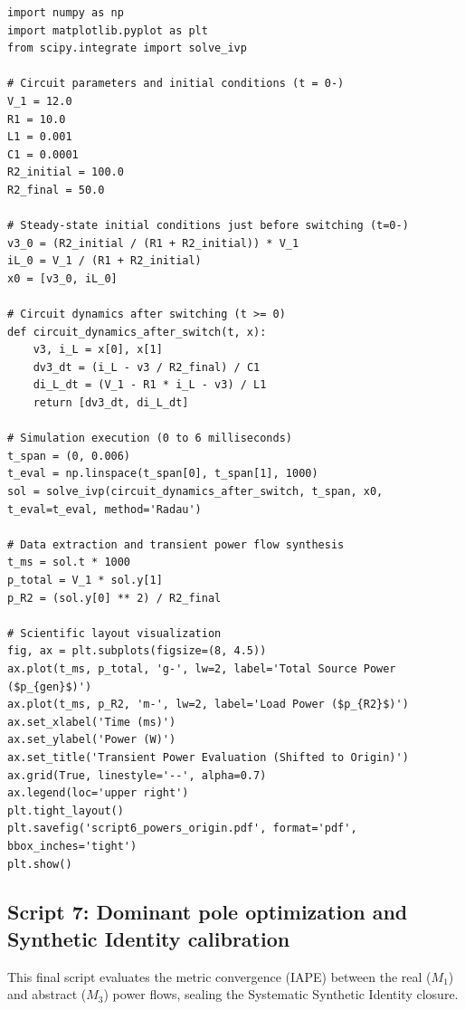 \documentclass[energies,accept,oneauthor,pdftex]{Definitions/mdpi}
\begin{document}
{\footnotesize
\begin{verbatim}
import numpy as np
import matplotlib.pyplot as plt
from scipy.integrate import solve_ivp

# Circuit parameters and initial conditions (t = 0-)
V_1 = 12.0
R1 = 10.0
L1 = 0.001
C1 = 0.0001
R2_initial = 100.0
R2_final = 50.0

# Steady-state initial conditions just before switching (t=0-)
v3_0 = (R2_initial / (R1 + R2_initial)) * V_1
iL_0 = V_1 / (R1 + R2_initial)
x0 = [v3_0, iL_0]

# Circuit dynamics after switching (t >= 0)
def circuit_dynamics_after_switch(t, x):
    v3, i_L = x[0], x[1]
    dv3_dt = (i_L - v3 / R2_final) / C1
    di_L_dt = (V_1 - R1 * i_L - v3) / L1
    return [dv3_dt, di_L_dt]

# Simulation execution (0 to 6 milliseconds)
t_span = (0, 0.006)
t_eval = np.linspace(t_span[0], t_span[1], 1000)
sol = solve_ivp(circuit_dynamics_after_switch, t_span, x0, t_eval=t_eval, method='Radau')

# Data extraction and transient power flow synthesis
t_ms = sol.t * 1000
p_total = V_1 * sol.y[1]
p_R2 = (sol.y[0] ** 2) / R2_final

# Scientific layout visualization
fig, ax = plt.subplots(figsize=(8, 4.5))
ax.plot(t_ms, p_total, 'g-', lw=2, label='Total Source Power ($p_{gen}$)')
ax.plot(t_ms, p_R2, 'm-', lw=2, label='Load Power ($p_{R2}$)')
ax.set_xlabel('Time (ms)')
ax.set_ylabel('Power (W)')
ax.set_title('Transient Power Evaluation (Shifted to Origin)')
ax.grid(True, linestyle='--', alpha=0.7)
ax.legend(loc='upper right')
plt.tight_layout()
plt.savefig('script6_powers_origin.pdf', format='pdf', bbox_inches='tight')
plt.show()
\end{verbatim}
}


\subsection*{Script 7: Dominant pole optimization and Synthetic Identity calibration}
This final script evaluates the metric convergence (IAPE) between the real ($M_1$) and abstract ($M_3$) power flows, sealing the Systematic Synthetic Identity closure.
\end{document}
